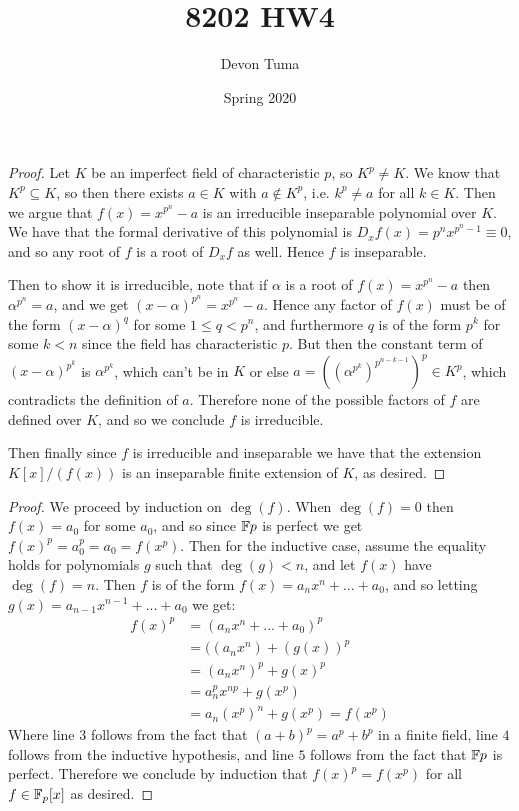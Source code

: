 \documentclass[11pt]{article}
\title{8202 HW4}
\author{Devon Tuma}
\date{Spring 2020}
\begin{document}
\maketitle

\begin{proof}
  Let $K$ be an imperfect field of characteristic $p$, so $K^p \ne K$.
  We know that $K^p \subseteq K$, so then there exists $a \in K$ with $a \not \in K^p$, i.e. $k^p \ne a$ for all $k \in K$. Then we argue that $f(x) = x^{p^n} - a$ is an irreducible inseparable polynomial over $K$.
  We have that the formal derivative of this polynomial is $D_x f(x) = p^n x^{p^n - 1} \equiv 0$, and so any root of $f$ is a root of $D_x f$ as well. Hence $f$ is inseparable.

  Then to show it is irreducible, note that if $\alpha$ is a root of $f(x) = x^{p^n} - a$ then $\alpha^{p^n} = a$, and we get $(x - \alpha)^{p^n} = x^{p^n} - a$.
  Hence any factor of $f(x)$ must be of the form $(x - \alpha)^{q}$ for some $1 \le q < p^n$, and furthermore $q$ is of the form $p^k$ for some $k < n$ since the field has characteristic $p$.
  But then the constant term of $(x - \alpha)^{p^k}$ is $\alpha^{p^k}$, which can't be in $K$ or else $a = ((\alpha^{p^k})^{p^{n - k - 1}})^p \in K^p$, which contradicts the definition of $a$.
  Therefore none of the possible factors of $f$ are defined over $K$, and so we conclude $f$ is irreducible. 

  Then finally since $f$ is irreducible and inseparable we have that the extension $K[x]/(f(x))$ is an inseparable finite extension of $K$, as desired.
\end{proof}


\begin{proof}
  We proceed by induction on $\deg(f)$.
  When $\deg(f) = 0$ then $f(x) = a_0$ for some $a_0$, and so since $\mathbb{F}{p}$ is perfect we get $f(x)^p = a_0^p = a_0 = f(x^p)$.
  Then for the inductive case, assume the equality holds for polynomials $g$ such that $\deg(g) < n$, and let $f(x)$ have $\deg(f) = n$.
  Then $f$ is of the form $f(x) = a_n x^n + ... + a_0$, and so letting $g(x) = a_{n-1}x^{n-1} + ... + a_0$ we get:
  \begin{align}
    f(x)^p & = (a_n x^n + ... + a_0)^p \\
           & = ((a_n x^n) + (g(x))^p \\
           & = (a_n x^n)^p + g(x)^p \\
           & = a_n^p x^{np} + g(x^p) \\
           & = a_n (x^p)^n + g(x^p) 
             = f(x^p) 
  \end{align}
  Where line $3$ follows from the fact that $(a + b)^p = a^p + b^p$ in a finite field, line $4$ follows from the inductive hypothesis, and line $5$ follows from the fact that $\mathbb{F}{p}$ is perfect.
  Therefore we conclude by induction that $f(x)^p = f(x^p)$ for all $f \in \mathbb{F}_p[x]$ as desired.
\end{proof}
\end{document}
